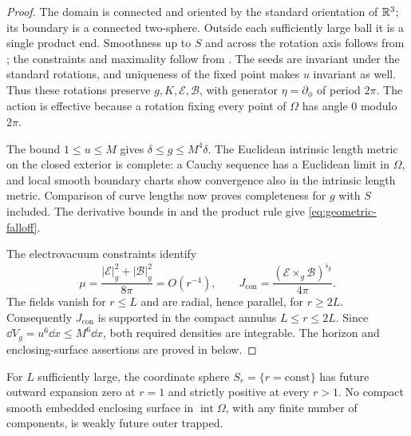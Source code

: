 \begin{proof}
The domain is connected and oriented by the standard orientation of $\mathbb R^3$;
its boundary is a connected two-sphere.  Outside each sufficiently large
ball it is a single product end.  Smoothness up to $S$ and across the rotation
axis follows from ; the constraints and
maximality follow from .  The seeds are invariant under
the standard rotations, and uniqueness of the fixed point makes $u$ invariant
as well.  Thus these rotations preserve $g,K,\mathcal E,\mathcal B$, with
generator $\eta=\partial_\phi$ of period $2\pi$.  The action is effective
because a rotation fixing every point of $\Omega$ has angle $0$ modulo $2\pi$.

The bound $1\le u\le M$ gives
$\delta\le g\le M^4\delta$.  The Euclidean intrinsic length metric on the
closed exterior is complete: a Cauchy sequence has a Euclidean limit in
$\Omega$, and local smooth boundary charts show convergence also in the
intrinsic length metric.  Comparison of curve lengths now proves completeness
for $g$ with $S$ included.  The derivative bounds in
 and the product rule give
\eqref{eq:geometric-falloff}.

The electrovacuum constraints identify
\[
 \mu=\frac{|\mathcal E|_g^2+|\mathcal B|_g^2}{8\pi}=O(r^{-4}),
 \qquad
 J_{\mathrm{con}}=\frac{(\mathcal E\times_g\mathcal B)^{\flat_g}}{4\pi}.
\]
The fields vanish for $r\le L$ and are radial, hence parallel, for $r\ge2L$.
Consequently $J_{\mathrm{con}}$ is supported in the compact annulus
$L\le r\le2L$.  Since $\dd V_g=u^6\dd x\le M^6\dd x$, both required
densities are integrable.  The horizon and enclosing-surface assertions are
proved in  below.
\end{proof}

\begin{lemma}\label{lem:positive-spheres}
For $L$ sufficiently large, the coordinate sphere $S_r=\{r=\mathrm{const}\}$
has future outward expansion zero at $r=1$ and strictly positive at every
$r>1$.  No compact smooth embedded enclosing surface in
$\operatorname{int}\Omega$, with any finite number of components, is weakly
future outer trapped.
\end{lemma}

